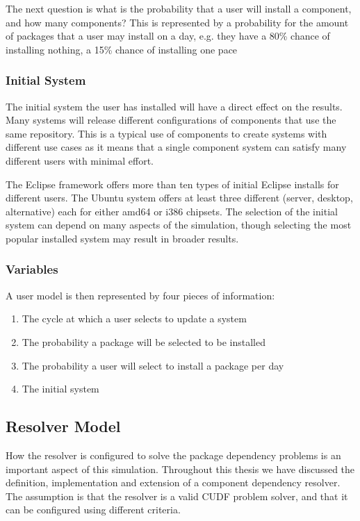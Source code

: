 The next question is what is the probability that a user will install a component, and how many components?
This is represented by a probability for the amount of packages that a user may install on a day,
e.g. they have a 80\% chance of installing nothing, a 15\% chance of installing one pace

\subsubsection{Initial System}
The initial system the user has installed will have a direct effect on the results.
Many systems will release different configurations of components that use the same repository.
This is a typical use of components to create systems with different use cases as it means that a single component system can satisfy many different users with minimal effort.

The Eclipse framework offers more than ten types of initial Eclipse installs for different users.
The Ubuntu system offers at least three different (server, desktop, alternative) each for either amd64 or i386 chipsets.
The selection of the initial system can depend on many aspects of the simulation, 
though selecting the most popular installed system may result in broader results. 

\subsubsection{Variables}
A user model is then represented by four pieces of information:
\begin{enumerate}
  \item The cycle at which a user selects to update a system
  \item The probability a package will be selected to be installed
  \item The probability a user will select to install a package per day
  \item The initial system
\end{enumerate}


\subsection{Resolver Model}
How the resolver is configured to solve the package dependency problems is an important aspect of this simulation.
Throughout this thesis we have discussed the definition, implementation and extension of a component dependency resolver.
The assumption is that the resolver is a valid CUDF problem solver, and that it can be configured using different criteria.

